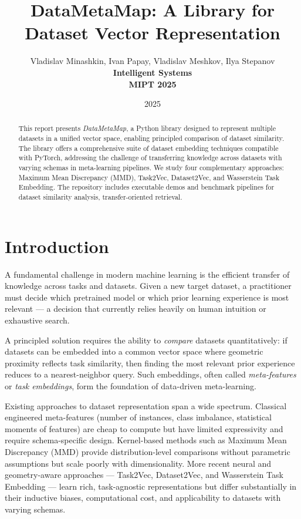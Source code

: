 \documentclass[peerreview]{IEEEtran}
\begin{document}
\title{DataMetaMap: A Library for Dataset Vector Representation}

\author{Vladislav Minashkin, Ivan Papay, Vladislav Meshkov, Ilya Stepanov \\
\textbf{Intelligent Systems} \\
\textbf{MIPT 2025}}

\date{2025}

\maketitle
\tableofcontents
\listoffigures

\IEEEpeerreviewmaketitle

\begin{abstract}
This report presents \textit{DataMetaMap}, a Python library designed to
represent multiple datasets in a unified vector space, enabling principled
comparison of dataset similarity. The library offers a comprehensive suite
of dataset embedding techniques compatible with PyTorch, addressing the
challenge of transferring knowledge across datasets with varying schemas in
meta-learning pipelines. We study four complementary approaches:
Maximum Mean Discrepancy (MMD), Task2Vec, Dataset2Vec, and
Wasserstein Task Embedding. The repository includes executable demos
and benchmark pipelines for dataset similarity analysis,
transfer-oriented retrieval.
\end{abstract}

\section{Introduction}
A fundamental challenge in modern machine learning is the efficient
transfer of knowledge across tasks and datasets. Given a new target
dataset, a practitioner must decide which pretrained model or which
prior learning experience is most relevant — a decision that
currently relies heavily on human intuition or exhaustive search.

A principled solution requires the ability to \emph{compare} datasets
quantitatively: if datasets can be embedded into a common vector space
where geometric proximity reflects task similarity, then finding the
most relevant prior experience reduces to a nearest-neighbor query.
Such embeddings, often called \emph{meta-features} or \emph{task
embeddings}, form the foundation of data-driven meta-learning.

Existing approaches to dataset representation span a wide spectrum.
Classical engineered meta-features (number of instances, class
imbalance, statistical moments of features) are cheap to compute but
have limited expressivity and require schema-specific design.
Kernel-based methods such as Maximum Mean Discrepancy (MMD) provide
distribution-level comparisons without parametric assumptions but
scale poorly with dimensionality. More recent neural and
geometry-aware approaches --- Task2Vec, Dataset2Vec, and Wasserstein
Task Embedding --- learn rich, task-agnostic representations but
differ substantially in their inductive biases, computational cost,
and applicability
to datasets with varying schemas.
\end{document}
